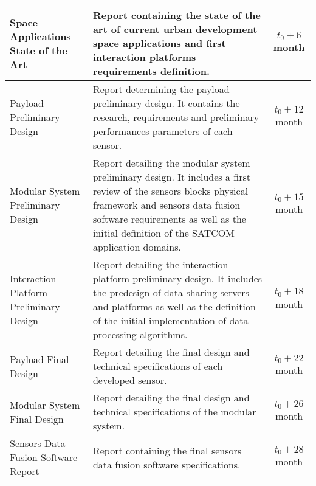 \begin{longtable}[H]{>{\raggedright\arraybackslash}p{4cm} p{8cm} c}
	\midrule
	
	Space Applications State of the Art & Report containing the state of the art of current urban development space applications and first interaction platforms requirements definition.&$t_0 + 6$ month\vspace{0.2cm} \\
	
	\midrule
	
	Payload Preliminary Design  & Report determining the payload preliminary design. It contains the research, requirements and preliminary performances parameters of each sensor.&$t_0 + 12$ month\vspace{0.2cm} \\
	
	\midrule
	
	Modular System Preliminary Design  & Report detailing the modular system preliminary design. It includes a first review of the sensors blocks physical framework and sensors data fusion software requirements as well as the initial definition of the SATCOM application domains.&$t_0 + 15$ month\vspace{0.2cm} \\
	
	\midrule
	
	Interaction Platform Preliminary Design  & Report detailing the interaction platform preliminary design. It includes the predesign of data sharing servers and platforms as well as the definition of the initial implementation of data processing algorithms.&$t_0 + 18$ month\vspace{0.2cm} \\
	
	\midrule
	
	Payload Final Design  & Report detailing the final design and technical specifications of each developed sensor.&$t_0 + 22$ month\vspace{0.2cm} \\
	
	\midrule
	
	Modular System  Final Design  & Report detailing the final design and technical specifications of the modular system.&$t_0 + 26$ month\vspace{0.2cm} \\ 
	
	\midrule
	
	Sensors Data Fusion Software Report  & Report containing the final sensors data fusion software specifications.&$t_0 + 28$ month\vspace{0.2cm} \\
	

\end{longtable}
